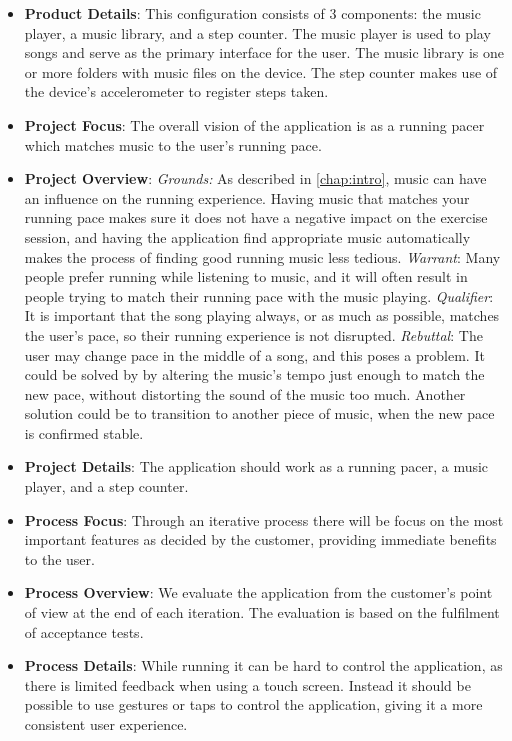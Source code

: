 \begin{itemize}
\item \textbf{Product Details}: This configuration consists of 3 components: the music player, a music library, and a step counter. The music player is used to play songs and serve as the primary interface for the user. The music library is one or more folders with music files on the device. The step counter makes use of the device's accelerometer to register steps taken.

\item \textbf{Project Focus}: The overall vision of the application is as a running pacer which matches music to the user's running pace.

\item \textbf{Project Overview}: \newline
\textit{Grounds:} As described in \cref{chap:intro}, music can have an influence on the running experience. Having music that matches your running pace makes sure it does not have a negative impact on the exercise session, and having the application find appropriate music automatically makes the process of finding good running music less tedious. \newline
\textit{Warrant}: Many people prefer running while listening to music, and it will often result in people trying to match their running pace with the music playing. \newline
\textit{Qualifier}: It is important that the song playing always, or as much as possible, matches the user's pace, so their running experience is not disrupted. \newline
\textit{Rebuttal}: The user may change pace in the middle of a song, and this poses a problem. It could be solved by by altering the music's tempo just enough to match the new pace, without distorting the sound of the music too much. Another solution could be to transition to another piece of music, when the new pace is confirmed stable.

\item \textbf{Project Details}: The application should work as a running pacer, a music player, and a step counter.

\item \textbf{Process Focus}: Through an iterative process there will be focus on the most important features as decided by the customer, providing immediate benefits to the user.

\item \textbf{Process Overview}: We evaluate the application from the customer's point of view at the end of each iteration. The evaluation is based on the fulfilment of acceptance tests.

\item \textbf{Process Details}: While running it can be hard to control the application, as there is limited feedback when using a touch screen. Instead it should be possible to use gestures or taps to control the application, giving it a more 
consistent user experience.
\end{itemize}